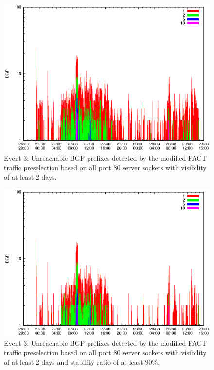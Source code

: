 \begin{figure}
	[p] \centering 
	\includegraphics[width=0.75\linewidth]{images/events/2010_08_27/bgp_log_port80_Set_stab_0_vts_2.eps}
	\caption{Event 3: Unreachable BGP prefixes detected by the modified FACT traffic preselection based on all port 80 server sockets with visibility of at least 2 days.} 
	\label{fig:RIPE_FACT_allSES80VTS2} 
\end{figure}

\begin{figure}
	[p] \centering 
	\includegraphics[width=0.75\linewidth]{images/events/2010_08_27/bgp_log_port80_Set_stab_9_vts_2.eps}
	\caption{Event 3: Unreachable BGP prefixes detected by the modified FACT traffic preselection based on all port 80 server sockets with visibility of at least 2 days and stability ratio of at least $90\%$.} 
	\label{fig:RIPE_FACT_allSES80VTS2STAB9} 
\end{figure}

